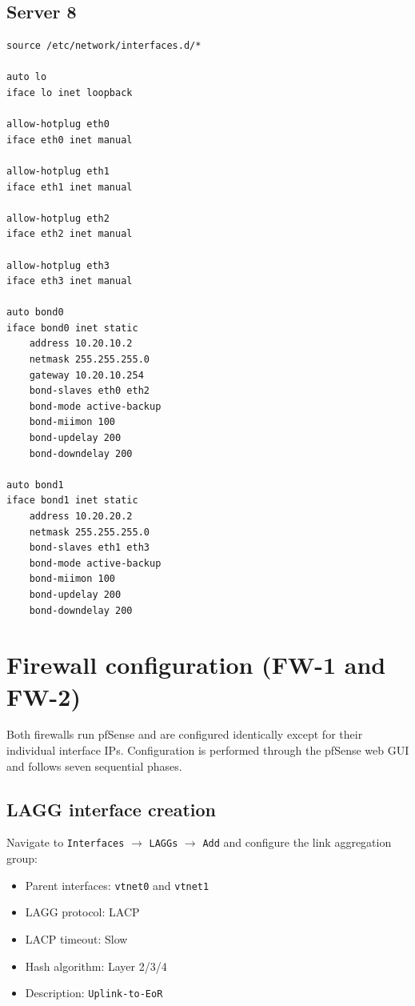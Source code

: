 \subsection{Server 8}
\begin{lstlisting}[caption={Server 8: network interfaces (Cabinet D, DMZ).},basicstyle=\ttfamily\footnotesize,breaklines=true]
source /etc/network/interfaces.d/*

auto lo
iface lo inet loopback

allow-hotplug eth0
iface eth0 inet manual

allow-hotplug eth1
iface eth1 inet manual

allow-hotplug eth2
iface eth2 inet manual

allow-hotplug eth3
iface eth3 inet manual

auto bond0
iface bond0 inet static
    address 10.20.10.2
    netmask 255.255.255.0
    gateway 10.20.10.254
    bond-slaves eth0 eth2
    bond-mode active-backup
    bond-miimon 100
    bond-updelay 200
    bond-downdelay 200

auto bond1
iface bond1 inet static
    address 10.20.20.2
    netmask 255.255.255.0
    bond-slaves eth1 eth3
    bond-mode active-backup
    bond-miimon 100
    bond-updelay 200
    bond-downdelay 200
\end{lstlisting}

\section{Firewall configuration (FW-1 and FW-2)}

Both firewalls run pfSense and are configured identically except for their individual interface IPs. Configuration is performed through the pfSense web GUI and follows seven sequential phases.

\subsection{LAGG interface creation}

Navigate to \texttt{Interfaces} $\rightarrow$ \texttt{LAGGs} $\rightarrow$ \texttt{Add} and configure the link aggregation group:

\begin{itemize}[nosep]
    \item Parent interfaces: \texttt{vtnet0} and \texttt{vtnet1}
    \item LAGG protocol: LACP
    \item LACP timeout: Slow
    \item Hash algorithm: Layer 2/3/4
    \item Description: \texttt{Uplink-to-EoR}
\end{itemize}

